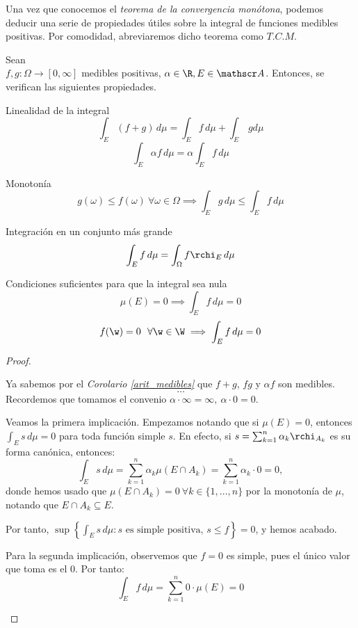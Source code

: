 Una vez que conocemos el \textit{teorema de la convergencia monótona}, podemos deducir una serie de propiedades útiles sobre la integral de funciones medibles positivas. Por comodidad, abreviaremos dicho teorema como $T.C.M$.

\begin{nprop} \label{int_medibles}
Sean \\ $f,g:\Omega \to [0,\infty]$ medibles positivas, $\alpha \in \R, E \in \mathscr A$. Entonces, se verifican las siguientes propiedades.

\begin{nlist}
\item Linealidad de la integral
  \[
    \int_E (f+g)\, d\mu = \int_E f\, d\mu + \int_E\, g d\mu
  \]
  \[
    \int_E \alpha f\, d\mu = \alpha \int_E f\, d\mu
  \]

\item Monotonía $$g(\omega) \leq f(\omega) \ \forall \omega \in \Omega \implies \int_E g\, d\mu \leq \int_E f\, d \mu$$

\item Integración en un conjunto más grande $$\int_E f\, d \mu =  \int_\Omega f\rchi_E \,d\mu$$

\item Condiciones suficientes para que la integral sea nula $$\mu(E) = 0 \implies \int_E f\, d\mu = 0$$ $$f(\w) = 0 \ \ \forall \w \in \W \implies \int_E f\,d\mu = 0$$
\end{nlist}
\end{nprop}

\begin{proof}\hfill
\begin{nlist}
    \item Ya sabemos por el \textit{Corolario \ref{arit_medibles}} que $f+g$, $fg$ y $\alpha f$ son medibles.
    $$\dots$$
    Recordemos que tomamos el convenio $\alpha \cdot \infty = \infty, \ \alpha \cdot 0 = 0$.

    \item
    \item
    \item Veamos la primera implicación. Empezamos notando que si $\mu(E) = 0$, entonces $\int_E s\,d\mu = 0$ para toda función simple $s$. En efecto, si $s = \sum_{k=1}^n \alpha_k \rchi_{A_k}$ es su forma canónica, entonces: $$\int_E s\,d\mu = \sum_{k=1}^n \alpha_k \mu(E \cap A_k) = \sum_{k=1}^n \alpha_k \cdot 0 = 0,$$ donde hemos usado que $\mu(E\cap A_k) = 0\ \forall k \in \{1,\dots,n\}$ por la monotonía de $\mu$, notando que $E\cap A_k \subseteq E$.

    Por tanto, $\displaystyle \sup\left\{\int_E s\,d\mu : s \text{ es simple positiva, } s \le f \right\} = 0$, y hemos acabado.

    Para la segunda implicación, observemos que $f=0$ es simple, pues el único valor que toma es el 0. Por tanto: $$\int_E f\,d\mu =  \sum_{k=1}^n 0\cdot \mu(E) = 0$$
\end{nlist}
\end{proof}

